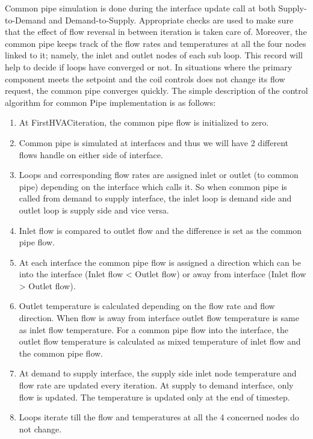 Common pipe simulation is done during the interface update call at both Supply-to-Demand and Demand-to-Supply. Appropriate checks are used to make sure that the effect of flow reversal in between iteration is taken care of. Moreover, the common pipe keeps track of the flow rates and temperatures at all the four nodes linked to it; namely, the inlet and outlet nodes of each sub loop. This record will help to decide if loops have converged or not. In situations where the primary component meets the setpoint and the coil controls does not change its flow request, the common pipe converges quickly. The simple description of the control algorithm for common Pipe implementation is as follows:

\begin{enumerate}
\def\labelenumi{\arabic{enumi}.}
\item
  At FirstHVACiteration, the common pipe flow is initialized to zero.
\item
  Common pipe is simulated at interfaces and thus we will have 2 different flows handle on either side of interface.
\item
  Loops and corresponding flow rates are assigned inlet or outlet (to common pipe) depending on the interface which calls it. So when common pipe is called from demand to supply interface, the inlet loop is demand side and outlet loop is supply side and vice versa.
\item
  Inlet flow is compared to outlet flow and the difference is set as the common pipe flow.
\item
  At each interface the common pipe flow is assigned a direction which can be into the interface (Inlet flow \textless{} Outlet flow) or away from interface (Inlet flow \textgreater{} Outlet flow).
\item
  Outlet temperature is calculated depending on the flow rate and flow direction. When flow is away from interface outlet flow temperature is same as inlet flow temperature. For a common pipe flow into the interface, the outlet flow temperature is calculated as mixed temperature of inlet flow and the common pipe flow.
\item
  At demand to supply interface, the supply side inlet node temperature and flow rate are updated every iteration. At supply to demand interface, only flow is updated. The temperature is updated only at the end of timestep.
\item
  Loops iterate till the flow and temperatures at all the 4 concerned nodes do not change.
\end{enumerate}

